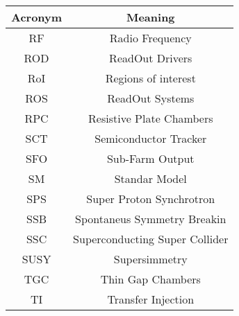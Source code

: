 \def\arraystretch{1.5}
\begin{tabular}{|c|c|}
\hline
\toprule
Acronym & Meaning \\ \midrule
RF          & Radio Frequency                                                     \\
ROD         & ReadOut Drivers                                                     \\
RoI         & Regions of interest                                                 \\
ROS         & ReadOut Systems                                                     \\
RPC         & Resistive Plate Chambers                                            \\
SCT         & Semiconductor Tracker                                               \\
SFO         & Sub-Farm Output                                                     \\
SM          & Standar Model                                                       \\
SPS         & Super Proton Synchrotron                                            \\
SSB         & Spontaneus Symmetry Breakin                                         \\
SSC         & Superconducting Super Collider                                      \\
SUSY        & Supersimmetry                                                       \\
TGC         & Thin Gap Chambers                                                   \\
TI          & Transfer Injection                                                  \\ \bottomrule
\end{tabular}








